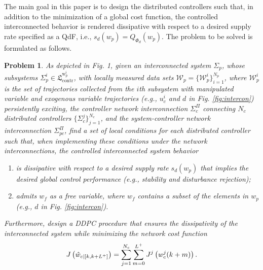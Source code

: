\documentclass[11pt,print,draftcls,onecolumn,romanappendices]{ieeecolor}
\newtheorem{prob}{Problem}
\newcommand{\LTI}[1]{\mathfrak{L}^{#1}}
\newcommand{\revise}[1]{{\color{black} #1}}
\newcommand{\bint}[1]{{|[#1]}}
\begin{document}
The main goal in this paper is to design the distributed controllers such that, in addition to the minimization of a global cost function, the controlled interconnected behavior is rendered dissipative with respect to a desired supply rate specified as a QdF, i.e., $s_d(w_p)=Q_{\Phi_d}(w_p)$. The problem to be solved is formulated as follows.
\revise{\begin{prob}\label{prob:problem}
    As depicted in Fig. 1, given an interconnected system $\Sigma_p$, whose subsystems $\Sigma_p^i\in\LTI{\mathrm{w}_\mathrm{p}^i}_\mathrm{contr}$, with locally measured data sets $\mathcal{W}_p =\{\mathcal{W}_p^i\}^{N_p}_{i=1}$, where $\mathcal{W}^i_p$ is the set of trajectories collected from the $i$th subsystem with manipulated variable and exogenous variable trajectories (e.g., $u_c^i$ and $d$ in Fig. \ref{fig:intercon}) persistently exciting, the controller network interconnection $\Sigma_c^\Pi$ connecting $N_c$ distributed controllers $\{\Sigma_c^j\}_{j=1}^{N_c}$, and the system-controller network interconnection $\Sigma_{pc}^\Pi$, find a set of local conditions for each distributed controller such that, when implementing these conditions under the network interconnections, the controlled interconnected system behavior
			\begin{enumerate}[1.]
				\item is dissipative with respect to a desired supply rate $s_d(w_p)$ that implies the desired global control performance (e.g., stability and disturbance rejection);
				\item admits $w_f$ as a free variable, where $w_{f}$ contains a subset of the elements in $w_p$ (e.g., $d$ in Fig. \ref{fig:intercon}).
			\end{enumerate}
			Furthermore, design a DDPC procedure that ensures the dissipativity of the interconnected system while minimizing the network cost function 
			\begin{equation}\label{eq:cost}
				J\left(\hat{w}_{c\bint{k,k+L^+}}\right)=\sum_{j=1}^{N_c}\sum_{m=0}^{L^+}{\revise{J^j}}\left(w_{c}^j(k+m)\right).
			\end{equation}
\end{prob}}
\end{document}
